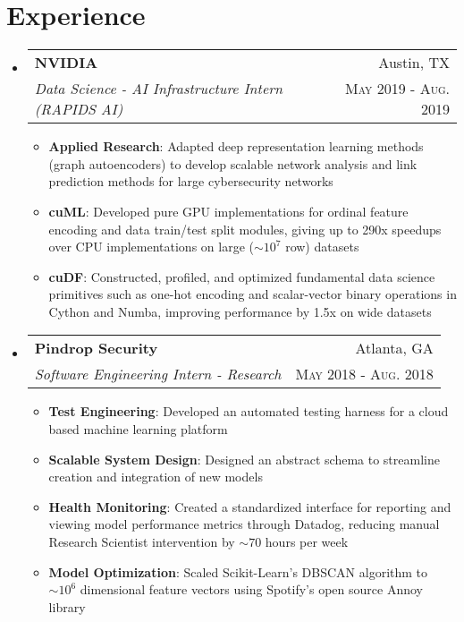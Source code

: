 \documentclass[letterpaper,11pt]{article}
\makeatletter
\newcommand{\resumeItem}[2]{
  \item\small{
    \textbf{#1}{: #2 \vspace{-2pt}}
  }
}
\newcommand{\resumeSubheading}[4]{
  \vspace{-1pt}\item[]
    \begin{tabular*}{0.97\textwidth}{l@{\extracolsep{\fill}}r}
      \textbf{#1} & #2 \\
      \textit{\small#3} & \textsc{\small #4} \\ %
    \end{tabular*}\vspace{-5pt}
}
\newcommand{\resumeSubHeadingListStart}{\begin{itemize}[leftmargin=*]}
\newcommand{\resumeSubHeadingListEnd}{\end{itemize}}
\newcommand{\resumeItemListStart}{\begin{itemize}}
\newcommand{\resumeItemListEnd}{\end{itemize}\vspace{-5pt}}
\newenvironment{resumeItemList}{\resumeItemListStart}{\resumeItemListEnd}
\newenvironment{resumeSubheadingList}{\resumeSubHeadingListStart}{\resumeSubHeadingListEnd}
\makeatother
\begin{document}
\section{Experience}
  \begin{resumeSubheadingList}
    \resumeSubheading
      {NVIDIA}{Austin, TX}
      {Data Science - AI Infrastructure Intern (RAPIDS AI)}{May 2019 - Aug. 2019}
      \begin{resumeItemList}
        \resumeItem{Applied Research}{Adapted deep representation learning methods (graph autoencoders) to develop scalable
        network analysis and link prediction methods for large cybersecurity networks}
        \resumeItem{cuML}{Developed pure GPU implementations for ordinal feature encoding and data train/test split modules,
        giving up to 290x speedups over CPU implementations on large ($\sim 10^7$ row) datasets}
        \resumeItem{cuDF}{Constructed, profiled, and optimized fundamental data science primitives such as one-hot encoding and scalar-vector binary operations
        in Cython and Numba, improving performance by 1.5x on wide datasets}
      \end{resumeItemList}


    \resumeSubheading
    {Pindrop Security}{Atlanta, GA}
    {Software Engineering Intern - Research}{May 2018 - Aug. 2018}
    \begin{resumeItemList}
      \resumeItem{Test Engineering}{Developed an automated testing harness for a cloud based machine learning platform}
      \resumeItem{Scalable System Design}{Designed an abstract schema to streamline creation and integration of new models}
      \resumeItem{Health Monitoring}{Created a standardized interface for reporting and viewing model performance metrics through
      Datadog, reducing manual Research Scientist intervention by $\sim 70$ hours per week}
      \resumeItem{Model Optimization}{Scaled Scikit-Learn's DBSCAN algorithm to $\sim 10^6$ dimensional feature vectors using 
      Spotify's open source Annoy library}
    \end{resumeItemList}
  \end{resumeSubheadingList}
\end{document}
